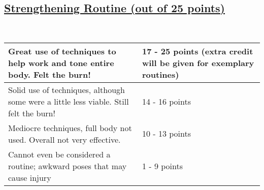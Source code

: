 \documentclass[a4paper, 11pt]{article}
\begin{document}
\subsection*{\underline{Strengthening Routine (out of 25 points)}}
\\
\begin{center}
\begin{tabular}{ | m{6cm} | m{6cm} | } 
\hline
\vspace{.2cm}Great use of techniques to help work and tone entire body. Felt the burn!\vspace{.2cm} & \vspace{.2cm}17 - 25 points (extra credit will be given for exemplary routines) \vspace{.2cm}  \\ 
\hline
\vspace{.2cm}Solid use of techniques, although some were a little less viable. Still felt the burn!\vspace{.2cm} &\vspace{.2cm} 14 - 16 points \vspace{.2cm} \\ 
\hline
\vspace{.2cm}Mediocre techniques, full body not used. Overall not very effective.\vspace{.2cm} &\vspace{.2cm} 10 - 13 points\vspace{.2cm}  \\ 
\hline
\vspace{.2cm}Cannot even be considered a routine; awkward poses that may cause injury \vspace{.2cm}&\vspace{.2cm} 1 - 9 points \vspace{.2cm} \\ 
\hline
\end{tabular}
\end{center}
\end{document}
